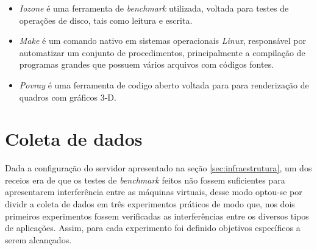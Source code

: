\begin{itemize}
\item \textit{Iozone} \footnotemark[6] é uma ferramenta de \textit{benchmark} utilizada, voltada para testes de operações de disco, tais como leitura e escrita.

\item \textit{Make} é um comando nativo em sistemas operacionais \textit{Linux}, responsável por automatizar um conjunto de procedimentos, principalmente  a compilação de programas grandes que possuem vários arquivos com códigos fontes. 

\item \textit{Povray} \footnotemark[7] é uma ferramenta de codigo aberto voltada para para renderização de quadros com gráficos 3-D.

\end{itemize}



\section{Coleta de dados} 
Dada a configuração do servidor apresentado na seção \ref{sec:infraestrutura}, um dos receios era de que os testes de \textit{benchmark} feitos não fossem suficientes para apresentarem interferência entre as máquinas virtuais, desse modo optou-se por dividr a coleta de dados em três experimentos práticos de modo que, nos dois primeiros experimentos fossem verificadas as interferências entre os diversos tipos de aplicações. Assim, para cada experimento foi definido objetivos específicos a serem alcançados.

